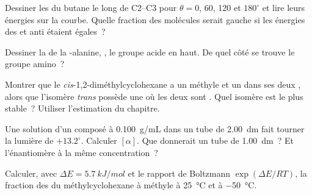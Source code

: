 \begin{exercise}[$\star\star$]\label{exo:b1:stereochemistry-in-depth:5}
Dessiner les  du butane le long de C2--C3 pour
$\theta = 0$, 60, 120 et $180^\circ$ et lire leurs énergies sur la
courbe. Quelle fraction des molécules serait gauche si les énergies des
 et anti étaient égales~?
\end{exercise}

\begin{exercise}[$\star\star$]\label{exo:b1:stereochemistry-in-depth:6}
Dessiner la  de la -alanine,
, le groupe acide en haut. De quel côté se trouve le
groupe amino~?
\end{exercise}

\begin{exercise}[$\star\star$]\label{exo:b1:stereochemistry-in-depth:7}
Montrer que le \textit{cis}-1,2-diméthylcyclohexane a un méthyle 
et un  dans ses deux , alors que l'isomère
\textit{trans} possède une  où les deux sont . Quel
isomère est le plus stable~? Utiliser l'estimation du chapitre.
\end{exercise}

\begin{exercise}[$\star\star$]\label{exo:b1:stereochemistry-in-depth:8}
Une solution d'un composé  à \qty{0.100}{g/mL} dans un tube de
\qty{2.00}{dm} fait tourner la lumière de $+13.2^\circ$. Calculer
$[\alpha]$. Que donnerait un tube de
\qty{1.00}{dm}~? Et l'énantiomère à la même concentration~?
\end{exercise}

\begin{exercise}[$\star\star$]\label{exo:b1:stereochemistry-in-depth:9}
Calculer, avec $\Delta E = \qty{5.7}{kJ/mol}$ et le rapport de Boltzmann
$\exp(\Delta E/RT)$, la fraction des  du méthylcyclohexane à
méthyle  à \qty{25}{\celsius} et à \qty{-50}{\celsius}.
\end{exercise}

